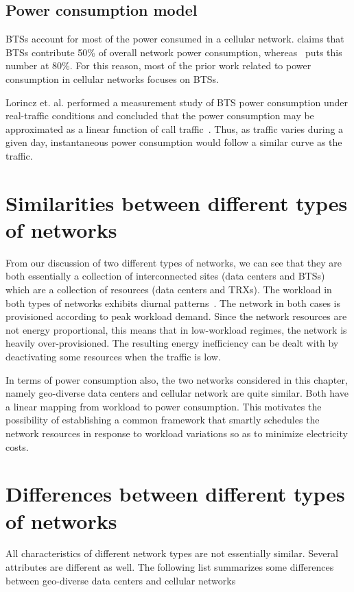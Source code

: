 \subsection{Power consumption model} %
BTSs account for most of the power consumed in a cellular network. \cite{Louhi:2007:BTSPower:INTELEC} claims that BTSs contribute 50\% of overall network power consumption, whereas~\cite{Oh:Comm:2011} puts this number at 80\%. For this reason, most of the prior work related to power consumption in cellular networks focuses on BTSs. 

Lorincz et. al. performed a measurement study of BTS power consumption under real-traffic conditions and concluded that the power consumption may be approximated as a linear function of call traffic~\cite{Lorincz:BTS-Measure:Sensors:2012}. Thus, as traffic varies during a given day, instantaneous power consumption would follow a similar curve as the traffic.

\section{Similarities between different types of networks} %
From our discussion of two different types of networks, we can see that they are both essentially a collection of interconnected sites (data centers and BTSs) which are a collection of resources (data centers and TRXs). The workload in both types of networks exhibits diurnal patterns~\cite{10.1109/MC.2007.443,Peng:2011:TPS:2030613.2030628}. The network in both cases is provisioned according to peak workload demand. Since the network resources are not energy proportional, this means that in low-workload regimes, the network is heavily over-provisioned. The resulting energy inefficiency can be dealt with by deactivating some resources when the traffic is low.

In terms of power consumption also, the two networks considered in this chapter, namely geo-diverse data centers and cellular network are quite similar. Both have a linear mapping from workload to power consumption. This motivates the possibility of establishing a common framework that smartly schedules the network resources in response to workload variations so as to minimize electricity costs.

\section{Differences between different types of networks}
\label{sec:background:differences}
All characteristics of different network types are not essentially similar. Several attributes are different as well. The following list summarizes some differences between geo-diverse data centers and cellular networks

